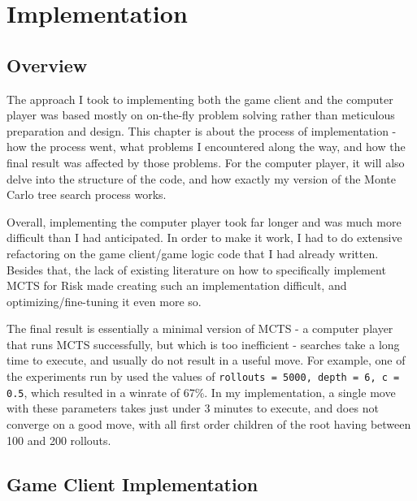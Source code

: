 \graphicspath{ {./Images/} }
\chapter{Implementation}
\section{Overview}
\label{implementationOverview}

The approach I took to implementing both the game client and the computer player was based mostly on on-the-fly problem solving rather than meticulous preparation and design. This chapter is about the process of implementation - how the process went, what problems I encountered along the way, and how the final result was affected by those problems. For the computer player, it will also delve into the structure of the code, and how exactly my version of the Monte Carlo tree search process works.

Overall, implementing the computer player took far longer and was much more difficult than I had anticipated. In order to make it work, I had to do extensive refactoring on the game client/game logic code that I had already written. Besides that, the lack of existing literature on how to specifically implement MCTS for Risk made creating such an implementation difficult, and optimizing/fine-tuning it even more so.

The final result is essentially a minimal version of MCTS - a computer player that runs MCTS successfully, but which is too inefficient - searches take a long time to execute, and usually do not result in a useful move. For example, one of the experiments run by \cite{limer2020monte} used the values of \texttt{rollouts = 5000, depth = 6, c = 0.5}, which resulted in a winrate of 67\%. In my implementation, a single move with these parameters takes just under 3 minutes to execute, and does not converge on a good move, with all first order children of the root having between 100 and 200 rollouts.

\section{Game Client Implementation}
\label{gameClientImplementation}
